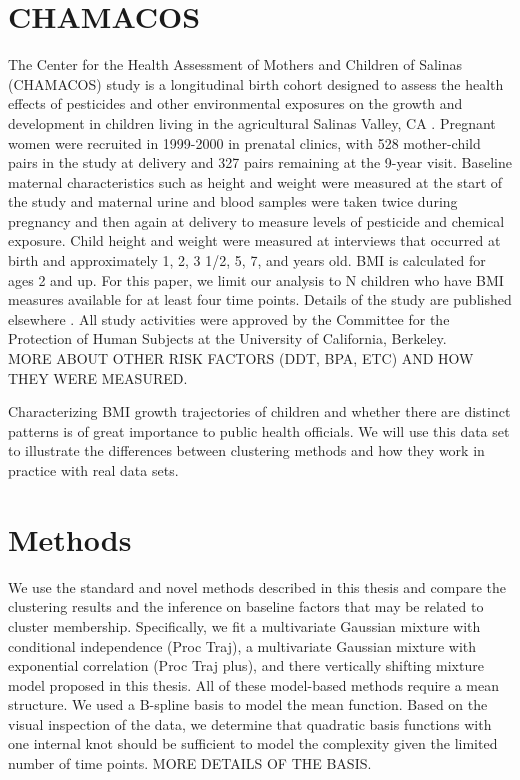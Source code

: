 \documentclass[11pt]{article}
\begin{document}
\section{CHAMACOS}
The Center for the Health Assessment of Mothers and Children of Salinas (CHAMACOS) study is a longitudinal birth cohort designed to assess the health effects of pesticides and other environmental exposures on the growth and development in children living in the agricultural Salinas Valley, CA \cite{eskenazi2004,eskenazi2005}. Pregnant women were recruited in 1999-2000 in prenatal clinics, with 528 mother-child pairs in the study at delivery and 327 pairs remaining at the 9-year visit. Baseline maternal characteristics such as height and weight were measured at the start of the study and maternal urine and blood samples were taken twice during pregnancy and then again at delivery to measure levels of pesticide and chemical exposure. Child height and weight  were measured at interviews that occurred at birth and approximately 1, 2, 3 1/2, 5, 7, and years old. BMI is calculated for ages 2 and up. For this paper, we limit our analysis to N children who have BMI measures available for at least four time points. Details of the study are published elsewhere \cite{eskenazi2003}. All study activities were approved by the Committee for the Protection of Human Subjects at the University of California, Berkeley. \\

MORE ABOUT OTHER RISK FACTORS (DDT, BPA, ETC) AND HOW THEY WERE MEASURED.

Characterizing BMI growth trajectories of children and whether there are distinct patterns is of great importance to public health officials. We will use this data set to illustrate the differences between clustering methods and how they work in practice with real data sets.\\

\section{Methods}
We use the standard and novel methods described in this thesis and compare the clustering results and the inference on baseline factors that may be related to cluster membership. Specifically, we fit a multivariate Gaussian mixture with conditional independence (Proc Traj), a multivariate Gaussian mixture with exponential correlation (Proc Traj plus), and there vertically shifting mixture model proposed in this thesis. All of these model-based methods require a mean structure. We used a B-spline basis to model the mean function. Based on the visual inspection of the data, we determine that quadratic basis functions with one internal knot should be sufficient to model the complexity given the limited number of time points.  MORE DETAILS OF THE BASIS. \\
\end{document}
